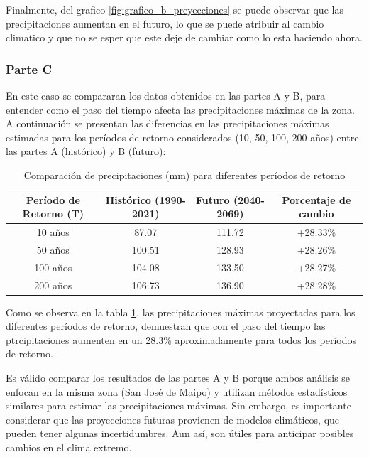 \documentclass{article}  %
\begin{document}
Finalmente, del grafico \ref{fig:grafico_b_preyecciones} se puede observar que las precipitaciones aumentan en el futuro, lo que se puede atribuir al cambio climatico y que no se esper que este deje de cambiar como lo esta haciendo ahora.

\subsubsection*{Parte C}

En este caso se compararan los datos obtenidos en las partes A y B, para entender como el paso del tiempo afecta las precipitaciones máximas de la zona. \\

A continuación se presentan las diferencias en las precipitaciones máximas estimadas para los períodos de retorno considerados (10, 50, 100, 200 años) entre las partes A (histórico) y B (futuro):

\begin{table}[H]
  \centering
  \caption{Comparación de precipitaciones (mm) para diferentes períodos de retorno}
  \vspace{0.2cm}
  \begin{tabular}{|c|c|c|c|}
  \hline
  \textbf{Período de Retorno (T)} & \textbf{Histórico (1990-2021)} & \textbf{Futuro (2040-2069)} & \textbf{Porcentaje de cambio} \\ \hline
  10 años  & 87.07 & 111.72 & +28.33\% \\ \hline
  50 años  & 100.51 & 128.93 & +28.26\% \\ \hline
  100 años & 104.08 & 133.50 & +28.27\% \\ \hline
  200 años & 106.73 & 136.90 & +28.28\% \\ \hline
  \end{tabular}
  \label{table:comparacion_c}
\end{table}

Como se observa en la tabla \ref{table:comparacion_c}, las precipitaciones máximas proyectadas para los diferentes períodos de retorno, demuestran que con el paso del tiempo las ptrcipitaciones aumenten en un 28.3\% aproximadamente para todos los períodos de retorno. 

Es válido comparar los resultados de las partes A y B porque ambos análisis se enfocan en la misma zona (San José de Maipo) y utilizan métodos estadísticos similares para estimar las precipitaciones máximas. Sin embargo, es importante considerar que las proyecciones futuras provienen de modelos climáticos, que pueden tener algunas incertidumbres. Aun así, son útiles para anticipar posibles cambios en el clima extremo.
\end{document}
